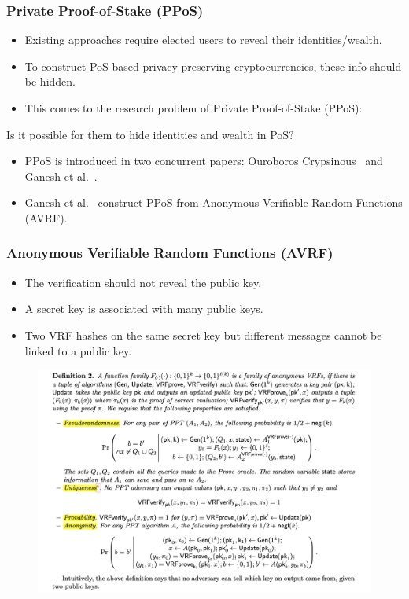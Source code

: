 \documentclass{beamer}
\begin{document}
\begin{frame}
\frametitle{Private Proof-of-Stake (PPoS)}

\begin{itemize}
    \item Existing approaches require elected users to reveal their identities/wealth.
    \item To construct PoS-based privacy-preserving cryptocurrencies, these info should be hidden.
    \item This comes to the research problem of Private Proof-of-Stake (PPoS):
\end{itemize}

\centerline{\color{red} Is it possible for them to hide identities and wealth in PoS?}

\begin{itemize}
    \item PPoS is introduced in two concurrent papers: Ouroboros Crypsinous~\cite{kerber2019ouroboros} and Ganesh et al.~\cite{ganesh2019proof}.
    \item Ganesh et al.~\cite{ganesh2019proof} construct PPoS from Anonymous Verifiable Random Functions (AVRF).
\end{itemize}

\end{frame}


\begin{frame}
\frametitle{Anonymous Verifiable Random Functions (AVRF)}
    
\begin{itemize}
    \item The verification should not reveal the public key.
    \item A secret key is associated with many public keys.
    \item Two VRF hashes on the same secret key but different messages cannot be linked to a public key.
\end{itemize}

\begin{figure}
    \centering
    \includegraphics[width=.7\textwidth]{figs/avrf-def.png}
\end{figure}


\end{frame}
\end{document}
